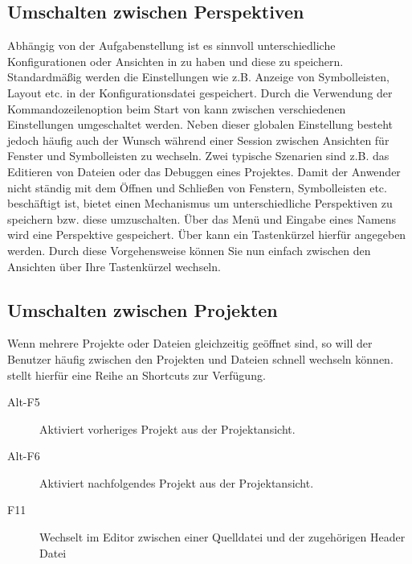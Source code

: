 \subsection{Umschalten zwischen Perspektiven}

Abhängig von der Aufgabenstellung ist es sinnvoll unterschiedliche Konfigurationen oder Ansichten in \codeblocks zu haben und diese zu speichern. Standardmäßig werden die Einstellungen wie z.B. Anzeige von Symbolleisten, Layout etc. in der Konfigurationsdatei  gespeichert. Durch die Verwendung der Kommandozeilenoption  beim Start von \codeblocks kann zwischen verschiedenen Einstellungen umgeschaltet werden. Neben dieser globalen Einstellung besteht jedoch häufig auch der Wunsch während einer Session zwischen Ansichten für Fenster und Symbolleisten zu wechseln. Zwei typische Szenarien sind z.B. das Editieren von Dateien oder das Debuggen eines Projektes. Damit der Anwender nicht ständig mit dem Öffnen und Schließen von Fenstern, Symbolleisten etc. beschäftigt ist, bietet \codeblocks einen Mechanismus um unterschiedliche Perspektiven zu speichern bzw. diese umzuschalten. Über das Menü  und Eingabe eines Namens  wird eine Perspektive gespeichert. Über  kann ein Tastenkürzel hierfür angegeben werden. Durch diese Vorgehensweise können Sie nun einfach zwischen den Ansichten über Ihre Tastenkürzel wechseln.


\subsection{Umschalten zwischen Projekten}

Wenn mehrere Projekte oder Dateien gleichzeitig geöffnet sind, so will der Benutzer häufig zwischen den Projekten und Dateien schnell wechseln können. \codeblocks stellt hierfür eine Reihe an Shortcuts zur Verfügung.

\begin{description}
\item[Alt-F5] Aktiviert vorheriges Projekt aus der Projektansicht.
\item[Alt-F6] Aktiviert nachfolgendes Projekt aus der Projektansicht.
\item[F11] Wechselt im Editor zwischen einer Quelldatei  und der zugehörigen Header Datei 
\end{description}


